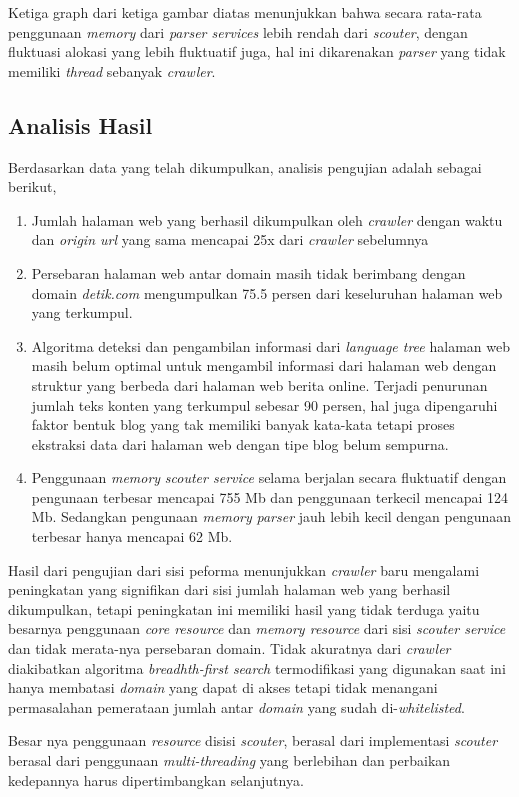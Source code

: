 Ketiga graph dari ketiga gambar diatas menunjukkan bahwa secara rata-rata penggunaan \emph{memory} dari \emph{parser services} lebih rendah dari \emph{scouter}, dengan fluktuasi alokasi yang lebih fluktuatif juga, hal ini dikarenakan \emph{parser} yang tidak memiliki \emph{thread} sebanyak \emph{crawler}.

\subsection{Analisis Hasil}

Berdasarkan data yang telah dikumpulkan, analisis pengujian adalah sebagai berikut,

\begin{enumerate}
  \item Jumlah halaman web yang berhasil dikumpulkan oleh \emph{crawler} dengan waktu dan \emph{origin url} yang sama mencapai 25x dari \emph{crawler} sebelumnya
  \item Persebaran halaman web antar domain masih tidak berimbang dengan domain \emph{detik.com} mengumpulkan 75.5 persen dari keseluruhan halaman web yang terkumpul. 
  \item Algoritma deteksi dan pengambilan informasi dari \emph{language tree} halaman web masih belum optimal untuk mengambil informasi dari halaman web dengan struktur yang berbeda dari halaman web berita online. Terjadi penurunan jumlah teks konten yang terkumpul sebesar 90 persen, hal juga dipengaruhi faktor bentuk blog yang tak memiliki banyak kata-kata tetapi proses ekstraksi data dari halaman web dengan tipe blog belum sempurna.
  \item Penggunaan \emph{memory} \emph{scouter service} selama berjalan secara fluktuatif dengan pengunaan terbesar mencapai 755 Mb dan penggunaan terkecil mencapai 124 Mb. Sedangkan pengunaan \emph{memory} \emph{parser} jauh lebih kecil dengan pengunaan terbesar hanya mencapai 62 Mb.
\end{enumerate}

Hasil dari pengujian dari sisi peforma menunjukkan \emph{crawler} baru mengalami peningkatan yang signifikan dari sisi jumlah halaman web yang berhasil dikumpulkan, tetapi peningkatan ini memiliki hasil yang tidak terduga yaitu besarnya penggunaan \emph{core resource} dan \emph{memory resource} dari sisi \emph{scouter service} dan tidak merata-nya persebaran domain. Tidak akuratnya dari \emph{crawler} diakibatkan algoritma \emph{breadhth-first search} termodifikasi yang digunakan saat ini hanya membatasi \emph{domain} yang dapat di akses tetapi tidak menangani permasalahan pemerataan jumlah antar \emph{domain} yang sudah di-\emph{whitelisted}.

Besar nya penggunaan \emph{resource} disisi \emph{scouter}, berasal dari implementasi \emph{scouter} berasal dari penggunaan \emph{multi-threading} yang berlebihan dan perbaikan kedepannya harus dipertimbangkan selanjutnya.
